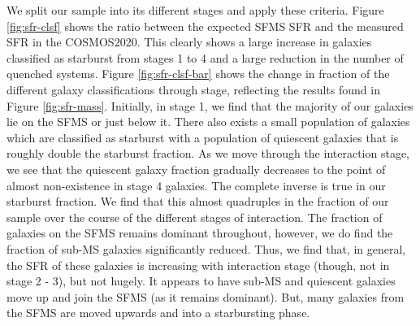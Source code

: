 \noindent We split our sample into its different stages and apply these criteria. Figure \ref{fig:sfr-clsf} shows the ratio between the expected SFMS SFR and the measured SFR in the COSMOS2020. This clearly shows a large increase in galaxies classified as starburst from stages 1 to 4 and a large reduction in the number of quenched systems. Figure \ref{fig:sfr-clsf-bar} shows the change in fraction of the different galaxy classifications through stage, reflecting the results found in Figure \ref{fig:sfr-mass}. Initially, in stage 1, we find that the majority of our galaxies lie on the SFMS or just below it. There also exists a small population of galaxies which are classified as starburst with a population of quiescent galaxies that is roughly double the starburst fraction. As we move through the interaction stage, we see that the quiescent galaxy fraction gradually decreases to the point of almost non-existence in stage 4 galaxies. The complete inverse is true in our starburst fraction. We find that this almost quadruples in the fraction of our sample over the course of the different stages of interaction. The fraction of galaxies on the SFMS remains dominant throughout, however, we do find the fraction of sub-MS galaxies significantly reduced. Thus, we find that, in general, the SFR of these galaxies is increasing with interaction stage (though, not in stage 2 - 3), but not hugely. It appears to have sub-MS and quiescent galaxies move up and join the SFMS (as it remains dominant). But, many galaxies from the SFMS are moved upwards and into a starbursting phase.

